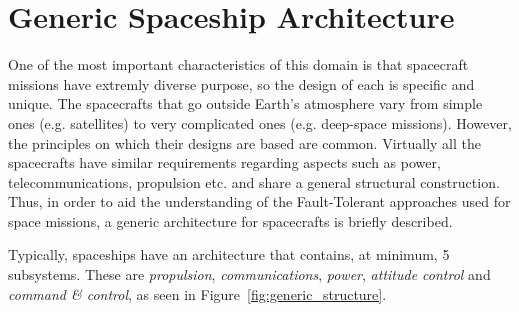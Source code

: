 \section{Generic Spaceship Architecture}
One of the most important characteristics of this domain is that spacecraft
missions have extremly diverse purpose, so the design of each is specific and
unique. The spacecrafts that go outside Earth's atmosphere vary from simple ones
(e.g. satellites) to very complicated ones (e.g. deep-space missions). However,
the principles on which their designs are based are common. Virtually all the
spacecrafts have similar requirements regarding aspects such as power,
telecommunications, propulsion etc. and share a general structural construction.
Thus, in order to aid the understanding of the Fault-Tolerant approaches used
for space missions, a generic architecture for spacecrafts is briefly described.

Typically, spaceships have an architecture that contains, at minimum, 5
subsystems\cite{ft-space-avionics}. These are \textit{propulsion},
\textit{communications}, \textit{power}, \textit{attitude control} and
\textit{command \& control}, as seen in Figure~\ref{fig:generic_structure}.

